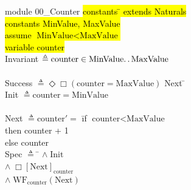 \documentclass[
  11pt,aspectratio=1610,pdf,hyperref={unicode,colorlinks=false}
]{beamer}
\begin{document}
%
%
\newenvironment{nstabbing}%
{\setlength{\topsep}{0pt}%
  \setlength{\partopsep}{0pt}%
  \tabbing}%
{\endtabbing}

\begin{frame}[c]
  \begin{columns}
  \begin{column}[c]{.6\textwidth}
    \small
    \moduleLeftDash%
    {\sc module} 00\_Counter    
    \moduleRightDash%
    \hl<2>
    \begin{nstabbing}
      {\sc constants} \= \kill
      {\sc extends}   \> Naturals\\
      [0pt \hl<3>]
      {\sc constants} \> MinValue, MaxValue \\
      [0pt \hl<4>]
      {\sc assume}    \> \( \text{MinValue} < \text{MaxValue} \) \\
      [0pt \hl<5>]
      {\sc variable}  \> counter
    \end{nstabbing}
    \begin{nstabbing}
      \\
      [0pt \hl<6>]
      Invariant \= \( \triangleq \text{counter} \in \text{MinValue}\ldotp\ldotp\text{MaxValue} \) \\
      \\
      [0pt \hl<7>]
      Success \> \( \triangleq \Diamond\Box (\text{counter} = \text{MaxValue}) \)
    \end{nstabbing}    
    \begin{nstabbing}
      Next \= \kill \\
      [0pt \hl<8>]
      Init \> \( \triangleq \text{counter} = \text{MinValue} \) \\
      \\
      [0pt \hl<9>]
      Next \> \( \triangleq \text{counter}'= \) \= {\sc if} \( \text{counter} < \text{MaxValue} \) 
      \+ \+ \\      
        {\sc then} counter + 1 \\
        {\sc else} counter \- \- \\
      [0pt \hl<10->]
      Spec \> \( \triangleq \) \= \+ \+ \( \wedge \; \text{Init} \) \\
      [0pt \hl<11->]
        \( \wedge \; \Box[\text{Next}]_\text{counter} \) \\
        [0pt \hl<12>]  
        \( \wedge \; \text{WF}_\text{counter}(\text{Next}) \)
    \end{nstabbing}
    \bottombar%
  \end{column}
  \begin{column}[c]{.3\textwidth}
    \centering\resizebox{!}{.9\textheight}{}%
  \end{column}
  \end{columns}
\end{frame}
\end{document}
